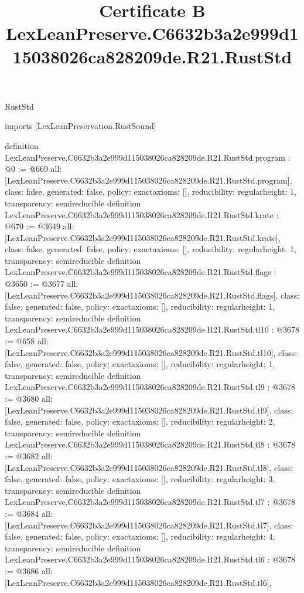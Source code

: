 \begin{lexlean}{RustStd}
\title{Certificate B LexLeanPreserve.C6632b3a2e999d115038026ca828209de.R21.RustStd}
\begin{coremodule}
imports [LexLeanPreservation.RustSound]

definition LexLeanPreserve.C6632b3a2e999d115038026ca828209de.R21.RustStd.program : @0 := @669 {
  all: [LexLeanPreserve.C6632b3a2e999d115038026ca828209de.R21.RustStd.program],
  class: false,
  generated: false,
  policy: exact{axioms: []},
  reducibility: regular{height: 1},
  transparency: semireducible
}
definition LexLeanPreserve.C6632b3a2e999d115038026ca828209de.R21.RustStd.krate : @670 := @3649 {
  all: [LexLeanPreserve.C6632b3a2e999d115038026ca828209de.R21.RustStd.krate],
  class: false,
  generated: false,
  policy: exact{axioms: []},
  reducibility: regular{height: 1},
  transparency: semireducible
}
definition LexLeanPreserve.C6632b3a2e999d115038026ca828209de.R21.RustStd.flags : @3650 := @3677 {
  all: [LexLeanPreserve.C6632b3a2e999d115038026ca828209de.R21.RustStd.flags],
  class: false,
  generated: false,
  policy: exact{axioms: []},
  reducibility: regular{height: 1},
  transparency: semireducible
}
definition LexLeanPreserve.C6632b3a2e999d115038026ca828209de.R21.RustStd.tl10 : @3678 := @658 {
  all: [LexLeanPreserve.C6632b3a2e999d115038026ca828209de.R21.RustStd.tl10],
  class: false,
  generated: false,
  policy: exact{axioms: []},
  reducibility: regular{height: 1},
  transparency: semireducible
}
definition LexLeanPreserve.C6632b3a2e999d115038026ca828209de.R21.RustStd.tl9 : @3678 := @3680 {
  all: [LexLeanPreserve.C6632b3a2e999d115038026ca828209de.R21.RustStd.tl9],
  class: false,
  generated: false,
  policy: exact{axioms: []},
  reducibility: regular{height: 2},
  transparency: semireducible
}
definition LexLeanPreserve.C6632b3a2e999d115038026ca828209de.R21.RustStd.tl8 : @3678 := @3682 {
  all: [LexLeanPreserve.C6632b3a2e999d115038026ca828209de.R21.RustStd.tl8],
  class: false,
  generated: false,
  policy: exact{axioms: []},
  reducibility: regular{height: 3},
  transparency: semireducible
}
definition LexLeanPreserve.C6632b3a2e999d115038026ca828209de.R21.RustStd.tl7 : @3678 := @3684 {
  all: [LexLeanPreserve.C6632b3a2e999d115038026ca828209de.R21.RustStd.tl7],
  class: false,
  generated: false,
  policy: exact{axioms: []},
  reducibility: regular{height: 4},
  transparency: semireducible
}
definition LexLeanPreserve.C6632b3a2e999d115038026ca828209de.R21.RustStd.tl6 : @3678 := @3686 {
  all: [LexLeanPreserve.C6632b3a2e999d115038026ca828209de.R21.RustStd.tl6],
}
\end{coremodule}
\end{lexlean}
